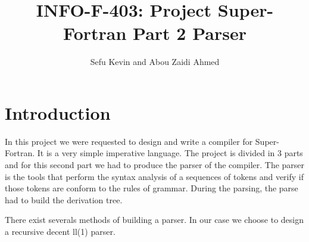 \documentclass[12pt]{article}
\title{INFO-F-403: Project Super-Fortran Part 2 Parser}
\author{Sefu Kevin and Abou Zaidi Ahmed}
\begin{document}
\maketitle
\section{Introduction}
In this project we were requested to design and write a compiler for Super-Fortran. It is a very simple
imperative language. The project is divided in 3 parts and for this second part we had to produce
the parser of the compiler. The parser is the tools that perform the syntax analysis of a sequences of tokens and verify if
those tokens are conform to the rules of grammar. During the parsing, the parse had to build the derivation tree.

There exist severals methods of building a parser. In our case we choose to design a recursive decent ll(1) parser.
\end{document}
